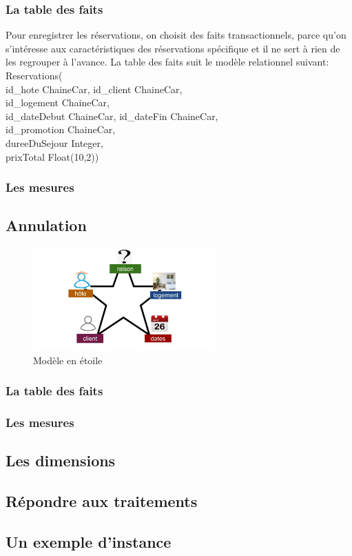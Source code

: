 \documentclass[11pt]{article}
\begin{document}
\subsubsection*{La table des faits}
Pour enregistrer les réservations, on choisit des faits transactionnels, parce qu'on s'intéresse aux caractéristiques des réservations spécifique et il ne sert à rien de les regrouper à l'avance. La table des faits suit le modèle relationnel suivant:\\
Reservations(\\
id\_hote ChaineCar, id\_client ChaineCar,\\
id\_logement ChaineCar,\\
id\_dateDebut ChaineCar, id\_dateFin ChaineCar,\\
id\_promotion ChaineCar,\\
dureeDuSejour Integer,\\
prixTotal Float(10,2))
\subsubsection*{Les mesures}
\subsection{Annulation}
\begin{figure}[h]
	\centering
	\includegraphics*[width=7cm]{img/modele_etoile_annulation.jpg}
	\caption{Modèle en étoile}
\end{figure}
\subsubsection*{La table des faits}

\subsubsection*{Les mesures}

\subsection{Les dimensions}

\subsection{Répondre aux traitements}

\subsection{Un exemple d'instance}
\end{document}
